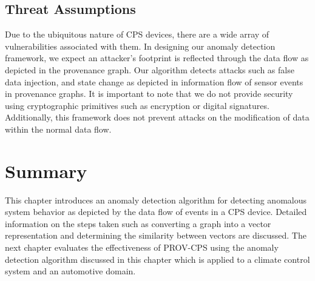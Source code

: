 

\subsection{Threat Assumptions}
Due to the ubiquitous nature of CPS devices, there are a wide array of vulnerabilities associated with them. In designing our anomaly detection framework, we expect an attacker's footprint is reflected through the data flow as depicted in the provenance graph. Our algorithm detects attacks such as false data injection, and state change as depicted in information flow of sensor events in provenance graphs. It is important to note that we do not provide security using cryptographic primitives such as encryption or digital signatures. Additionally, this framework does not prevent attacks on the modification of data within the normal data flow.


\section{Summary}

This chapter introduces an anomaly detection algorithm for detecting anomalous system behavior as depicted by the data flow of events in a CPS device. Detailed information on the steps taken such as converting a graph into a vector representation and determining the similarity between vectors are discussed. The next chapter evaluates the effectiveness of PROV-CPS using the anomaly detection algorithm discussed in this chapter which is applied to a climate control system and an automotive domain. 



